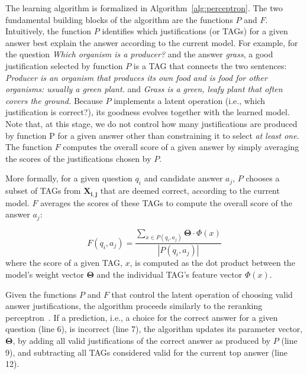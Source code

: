 The learning algorithm is formalized in Algorithm~\ref{alg:perceptron}. The two fundamental building blocks of the algorithm are the functions $P$ and $F$. 
Intuitively, the function $P$ identifies which justifications (or TAGs) for a given answer best explain the answer according to the current model. For example, for the question {\em Which organism is a producer?} and the answer {\em grass}, a good justification selected by function $P$ is a TAG that connects the two sentences: {\em Producer is an organism that produces its own food and is food for other organisms: usually a green plant.} and {\em Grass is a green, leafy plant that often covers the ground.} 
Because $P$ implements a latent operation (i.e., which justification is correct?), its goodness evolves together with the learned model. 
Note that, at this stage, we do not control how many justifications are produced by function P for a given answer other than constraining it to select {\em at least one}. The function $F$ computes the overall score of a given answer by simply averaging the scores of the justifications chosen by $P$. 

More formally, for a given question $q_i$ and candidate answer $a_j$, $P$ chooses a subset of TAGs from $\boldsymbol{X_{i,j}}$ that are deemed correct, according to the current model. $F$ averages the scores of these TAGs to compute the overall score of the answer $a_j$:

\begin{equation}
\label{eq:F}
F(q_i, a_j) = \frac{\sum_{x \in P(q_i, a_j)} \boldsymbol{\Theta} \cdot \Phi(x)}{|P(q_i, a_j)|}
\end{equation}
where the score of a given TAG, $x$, is computed as the dot product between the model's weight vector $\boldsymbol{\Theta}$  and the individual TAG's feature vector $\Phi(x)$. 

Given the functions $P$ and $F$ that control the latent operation of choosing valid answer justifications, the algorithm proceeds similarly to the reranking perceptron~\citep{Shen:Joshi:2005}. If a prediction, i.e., a choice for the correct answer for a given question (line 6), is incorrect (line 7), the algorithm updates its parameter vector, $\boldsymbol{\Theta}$, by adding all valid justifications of the correct answer as produced by $P$ (line 9), and subtracting all TAGs considered valid for the current top answer (line 12). 


